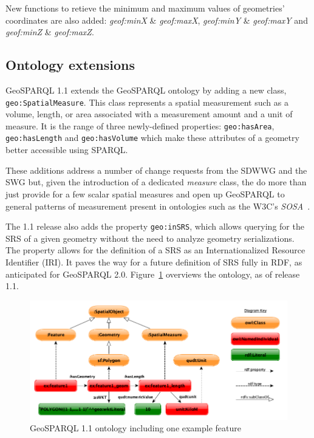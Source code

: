 \documentclass[runningheads]{llncs}
\begin{document}
New functions to retieve the minimum and maximum values of geometries' coordinates are also added: \emph{geof:minX} \& \emph{geof:maxX},
\emph{geof:minY} \& \emph{geof:maxY} and \emph{geof:minZ} \& \emph{geof:maxZ}.

\subsection{Ontology extensions}\label{sec:ontexts}
GeoSPARQL 1.1 extends the GeoSPARQL ontology by adding a new class, \texttt{geo:SpatialMeasure}. This class represents a spatial measurement 
such as a volume, length, or area associated with a measurement amount and a unit of measure. It is the range of three newly-defined properties:
\texttt{geo:hasArea}, \texttt{geo:hasLength} and \texttt{geo:hasVolume} which make these attributes of a geometry better accessible using 
SPARQL. 

These additions address a number of change requests from the SDWWG and the SWG but, given the introduction of a dedicated \textit{measure} class, 
the do more than just provide for a few scalar spatial measures and open up GeoSPARQL to general patterns of measurement present in ontologies 
such as the W3C's \textit{SOSA}~\cite{haller_semantic_2017}.

The 1.1 release also adds the property \texttt{geo:inSRS}, which allows querying for the SRS of a given geometry without the need to analyze 
geometry serializations. The property allows for the definition of a SRS as an Internationalized Resource Identifier (IRI). It paves the way 
for a future definition of SRS fully in RDF, as anticipated for GeoSPARQL 2.0. Figure~\ref{fig:geosparql11ontology} overviews the ontology, as 
of release 1.1.

\begin{figure}[htb]
    \centering
    \includegraphics[width=\linewidth]{images/geold_ontology.png}
    \caption{GeoSPARQL 1.1 ontology including one example feature}
    \label{fig:geosparql11ontology}
\end{figure}
\end{document}
